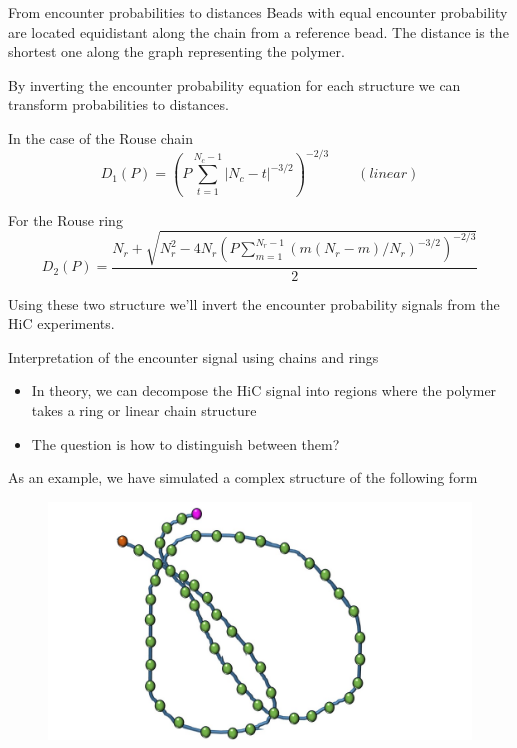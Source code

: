 \documentclass[8pt]{beamer}
\begin{document}
\begin{frame}{From encounter probabilities to distances}
Beads with equal encounter probability are located equidistant along the chain from a reference bead. 
The distance is the shortest one along the graph representing the polymer.

By inverting the encounter probability equation for each structure we can transform probabilities to distances. 

In the case of the Rouse chain 
\begin{equation*}
D_1(P) = \left(P\sum_{t=1}^{N_c-1}|N_c-t|^{-3/2}\right)^{-2/3} \qquad (linear)
\end{equation*}

For the Rouse ring 
\begin{equation*}
D_2(P) =  \frac{N_r+\sqrt{N_r^2-4N_r\left(P\displaystyle\sum_{m=1}^{N_r-1}(m(N_r-m)/N_r)^{-3/2}\right)^{-2/3}}}{2}
\end{equation*}

Using these two structure we'll invert the encounter probability signals from the HiC experiments. 

\end{frame}

\begin{frame}{Interpretation of the encounter signal using chains and rings}
\begin{itemize}
\item In theory, we can decompose the HiC signal into regions where the polymer takes a ring or linear chain structure
\item The question is how to distinguish between them?

\end{itemize}
As an example, we have simulated a complex structure of the following form 

\begin{figure}
\includegraphics[scale=0.2]{polymerModelWithCompositeStructure}
\end{figure}


\end{frame}
\end{document}
